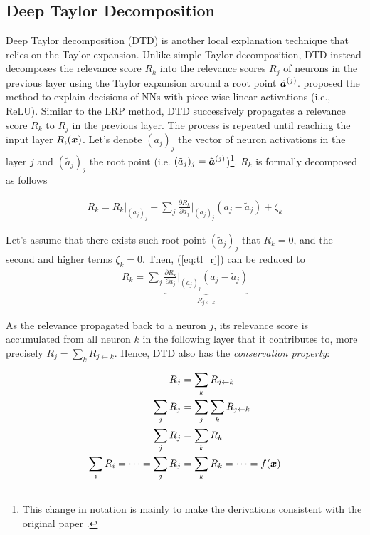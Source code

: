 \subsection{Deep Taylor Decomposition}


Deep Taylor decomposition (DTD) is another local explanation technique that relies on the Taylor expansion. Unlike simple Taylor decomposition, DTD instead decomposes the relevance score $R_k$ into the relevance scores $R_j$  of neurons in the previous layer using the Taylor expansion around a root point $\tilde{\patvector{a}}^{(j)}$. \cite{MontavonExplainingnonlinearclassification2017} proposed the method to explain decisions of NNs with piece-wise linear activations (i.e., ReLU). Similar to the LRP method, DTD successively propagates a relevance score  $R_k$ to $R_j$ in the previous layer. The process is repeated until reaching the input layer $R_i(\boldsymbol{x})$. Let's denote $(a_j)_j$ the vector of neuron activations in the layer $j$ and $(\tilde{a}_j)_j$ the root point (i.e. $(\tilde{a}_j)_j = \tilde{\patvector{a}}^{(j)}$)\footnote{This  change in notation is mainly to make the derivations consistent with the original paper \citep{MontavonExplainingnonlinearclassification2017}.}. $R_k$ is formally decomposed as follows




 \begin{align} \label{eq:tl_rj}
 R_k = R_k \bigg|_{ (\tilde{a}_j)_j } + \sum_{ j } 	\frac{\partial  R_k }{ \partial a_j } \bigg|_{ (\tilde{a}_j)_j } ( a_j - \tilde{a}_j ) + \zeta_k
 \end{align}

Let's assume that there exists such root point $(\tilde{a}_j)_j$ that $R_k = 0$, and the second and higher terms $\zeta_k = 0 $. Then, (\ref{eq:tl_rj}) can be reduced to
\begin{align*}
 R_k = \sum_{ j } \underbrace{	\frac{\partial  R_k }{ \partial a_j } \bigg|_{ (\tilde{a}_j)_j }  ( a_j - \tilde{a}_j ) }_{ R_{j \leftarrow k } }
\end{align*}

As the relevance propagated back to a neuron $j$, its relevance score is accumulated from all neuron $k$ in the following layer that it contributes to, more precisely $R_j = \sum_{k} R_{j\leftarrow k}$. Hence, DTD also has the  \textit{conservation property}:

\begin{align} 
	R_j &= \sum_{k} R_{j\leftarrow k} \nonumber \\
\sum_{j}	R_j &= \sum_{j} \sum_{k} R_{j\leftarrow k} \nonumber\\
\sum_{j}	R_j &= \sum_{k}  R_{k} \nonumber \\
\sum_i 	R_{i} = 	\dots = \sum_j R_{j} &= \sum_k R_{k} = \dots =  f(\patvector{x}) \nonumber
\end{align}

